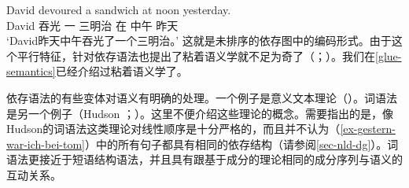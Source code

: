 \ea
\label{ex-david-devoured-a-sandwich-at-noon-yesterday-two}
\gll David devoured a sandwich at noon yesterday.\\
David 吞光 一 三明治 在 中午 昨天\\
\glt `David昨天中午吞光了一个三明治。'
\z
这就是未排序的依存图中的编码形式。由于这个平行特征，\citet[]{Broeker2003a-u}针对依存语法也提出了粘着语义学就不足为奇了（\citealp*{DLS93a-u}；\citealp[\S~8]{Dalrymple2001a-u}）。我们在\ref{glue-semantics}已经介绍过粘着语义学了。

依存语法的有些变体对语义有明确的处理。一个例子是意义文本理论（\mttc）\citep{Melcuk88a-u}。词语法是另一个例子（Hudson \citeyear[\S~7]{Hudson91a-u}；\citeyear[\S~5]{Hudson2007a-u}）。这里不便介绍这些理论的概念。需要指出的是，像Hudson的词语法这类理论对线性顺序是十分严格的，而且并不认为（\ref{ex-gestern-war-ich-bei-tom}）中的所有句子都具有相同的依存结构（请参阅\ref{sec-nld-dg}）。词语法更接近于短语结构语法，并且具有跟基于成分的理论相同的成分序列与语义的互动关系。



